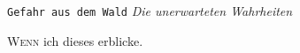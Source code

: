 \texttt{\Huge Gefahr aus dem Wald}
\newline
\textit{\Large Die unerwarteten Wahrheiten}
\normalsize
\begin{adjmulticols*}{3}{0pt}{0in}
  \lettrine{W}{enn} ich dieses erblicke. \lipsum 
\end{adjmulticols*}